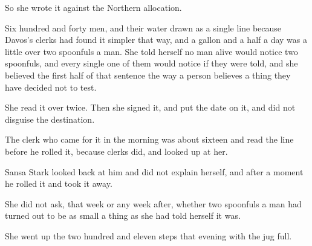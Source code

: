 So she wrote it against the Northern allocation.

Six hundred and forty men, and their water drawn as a single line because Davos’s clerks had found it simpler that way, and a gallon and a half a day was a little over two spoonfuls a man. She told herself no man alive would notice two spoonfuls, and every single one of them would notice if they were told, and she believed the first half of that sentence the way a person believes a thing they have decided not to test.

She read it over twice. Then she signed it, and put the date on it, and did not disguise the destination.

The clerk who came for it in the morning was about sixteen and read the line before he rolled it, because clerks did, and looked up at her.

Sansa Stark looked back at him and did not explain herself, and after a moment he rolled it and took it away.

She did not ask, that week or any week after, whether two spoonfuls a man had turned out to be as small a thing as she had told herself it was.

She went up the two hundred and eleven steps that evening with the jug full.